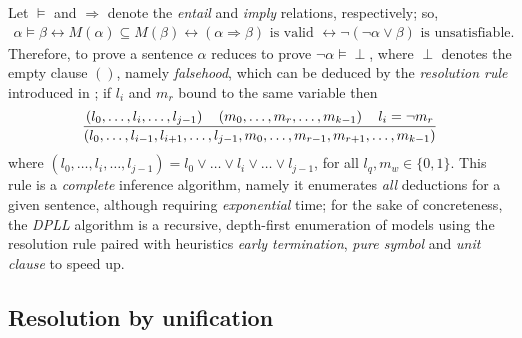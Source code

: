 \documentclass[a4paper,11pt]{article}
\begin{document}
Let $\models$ and $\Rightarrow$ denote the \textit{entail} and \textit{imply}
relations, respectively; so,
\begin{displaymath}
\begin{split}
\alpha \models \beta \leftrightarrow
M(\alpha) \subseteq M(\beta) \leftrightarrow
(\alpha \Rightarrow \beta) \text{ is valid } \leftrightarrow
\neg(\neg\alpha \vee \beta) \text{ is unsatisfiable.}
\end{split}
\end{displaymath}
Therefore, to prove a sentence $\alpha$ reduces to prove
$\neg\alpha\models\perp$, where $\perp$ denotes the empty clause $()$, namely
\textit{falsehood}, which can be deduced by the \textit{resolution rule}
introduced in \citep{Robinson:1965:MLB:321250.321253}; if $l_{i}$ and $m_{r}$
bound to the same variable then
\begin{displaymath}
{\left(l_{0}, \ldots, l_{i}, \ldots, l_{j-1}\right) \quad \left(m_{0}, \ldots, m_{r},\ldots, m_{k-1}\right) \quad l_{i} = \neg m_{r}
\over
\left(l_{0},\ldots, l_{i-1},l_{i+1}, \ldots,l_{j-1}, m_{0},\ldots, m_{r-1},m_{r+1},\ldots, m_{k-1}\right)}
\end{displaymath}
where $\left(l_{0},\ldots, l_{i}, \ldots, l_{j-1}\right) = l_{0}\vee \ldots
\vee l_{i} \vee \ldots \vee l_{j-1}$, for all $l_{q}, m_{w} \in\lbrace 0,1\rbrace$.
This rule is a \textit{complete} inference algorithm, namely it enumerates
\emph{all} deductions for a given sentence, although requiring
\emph{exponential} time; for the sake of concreteness, the \textit{DPLL}
algorithm \citep{Davis:1962:MPT:368273.368557}
is a recursive, depth-first enumeration of models using the
resolution rule paired with heuristics \textit{early termination},
\textit{pure symbol} and \textit{unit clause} to speed up.

\subsection{Resolution by unification}
\end{document}

